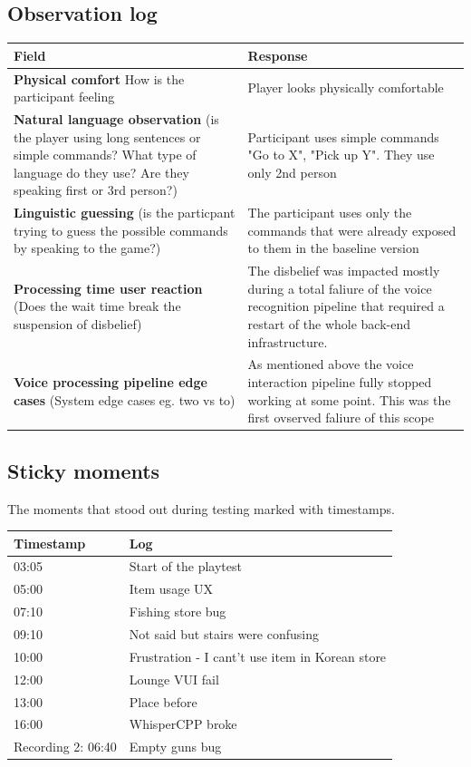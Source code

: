 \subsection{Observation log}
\begin{table}[H]
\centering
\begin{tabular}{|p{5cm}|p{10cm}|}
\hline
\textbf{Field} & \textbf{Response} \\ \hline
\textbf{Physical comfort} How is the participant feeling & Player looks physically comfortable \\[1.5cm] \hline
\textbf{Natural language observation} (is the player using long sentences or simple commands? What type of language do they use? Are they speaking first or 3rd person?) & Participant uses simple commands "Go to X", "Pick up Y". They use only 2nd person\\[1.5cm] \hline
\textbf{Linguistic guessing} (is the particpant trying to guess the possible commands by speaking to the game?) & The participant uses only the commands that were already exposed to them in the baseline version\\[1.5cm] \hline
\textbf{Processing time user reaction} (Does the wait time break the suspension of disbelief)& The disbelief was impacted mostly during a total faliure of the voice recognition pipeline that required a restart of the whole back-end infrastructure.\\[1.5cm] \hline
\textbf{Voice processing pipeline edge cases} (System edge cases eg. two vs to)& As mentioned above the voice interaction pipeline fully stopped working at some point. This was the first ovserved faliure of this scope\\[1.5cm] \hline
\end{tabular}
\end{table}

\subsection{Sticky moments}
The moments that stood out during testing marked with timestamps.
\begin{table}[h]
\centering
\begin{tabular}{|p{3cm}|p{10cm}|}
\hline
\textbf{Timestamp} & \textbf{Log} \\ \hline
03:05 & Start of the playtest \\ \hline 
05:00 & Item usage UX \\ \hline 
07:10 & Fishing store bug \\ \hline 
09:10 & Not said but stairs were confusing \\ \hline 
10:00 & Frustration - I cant't use item in Korean store \\ \hline 
12:00 & Lounge VUI fail \\ \hline 
13:00 & Place before \\ \hline 
16:00 & WhisperCPP broke \\ \hline 
Recording 2: 06:40 & Empty guns bug \\ \hline 



\end{tabular}
\end{table}

